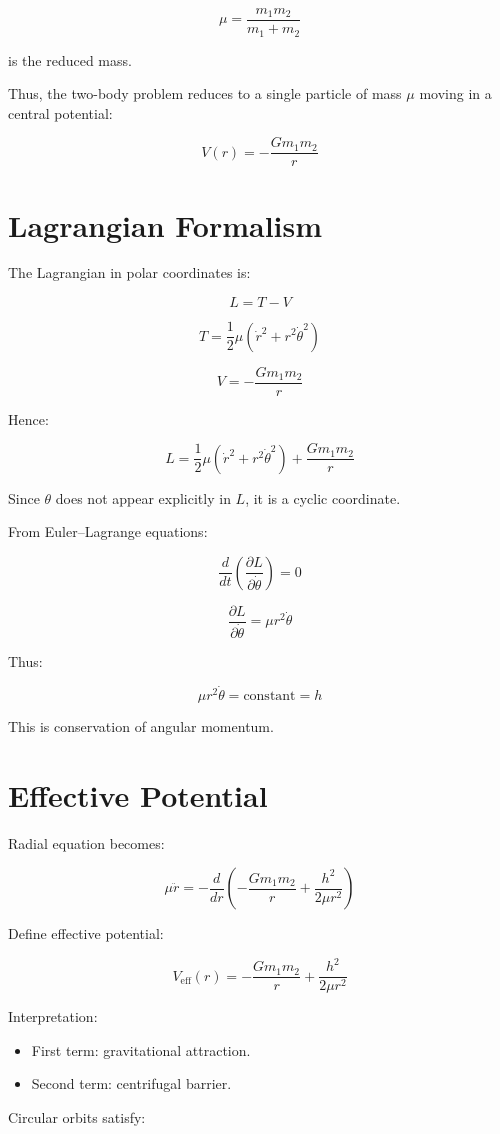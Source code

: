 \documentclass[14pt,a4paper]{article}
\begin{document}
\[
\mu = \frac{m_1 m_2}{m_1 + m_2}
\]

is the reduced mass.

Thus, the two-body problem reduces to a single particle of mass $\mu$ moving in a central potential:

\[
V(r) = -\frac{G m_1 m_2}{r}
\]

\section{Lagrangian Formalism}

The Lagrangian in polar coordinates is:

\[
L = T - V
\]

\[
T = \frac{1}{2}\mu \left( \dot{r}^2 + r^2 \dot{\theta}^2 \right)
\]

\[
V = -\frac{G m_1 m_2}{r}
\]

Hence:

\[
L = \frac{1}{2}\mu \left( \dot{r}^2 + r^2 \dot{\theta}^2 \right)
+ \frac{G m_1 m_2}{r}
\]

Since $\theta$ does not appear explicitly in $L$, it is a cyclic coordinate.

From Euler–Lagrange equations:

\[
\frac{d}{dt} \left( \frac{\partial L}{\partial \dot{\theta}} \right) = 0
\]

\[
\frac{\partial L}{\partial \dot{\theta}} = \mu r^2 \dot{\theta}
\]

Thus:

\[
\mu r^2 \dot{\theta} = \text{constant} = h
\]

This is conservation of angular momentum.

\section{Effective Potential}

Radial equation becomes:

\[
\mu \ddot{r} = -\frac{d}{dr} \left( -\frac{G m_1 m_2}{r} + \frac{h^2}{2\mu r^2} \right)
\]

Define effective potential:

\[
V_{\text{eff}}(r) = -\frac{G m_1 m_2}{r}
+ \frac{h^2}{2\mu r^2}
\]

Interpretation:
\begin{itemize}
\item First term: gravitational attraction.
\item Second term: centrifugal barrier.
\end{itemize}
Circular orbits satisfy:
\end{document}
